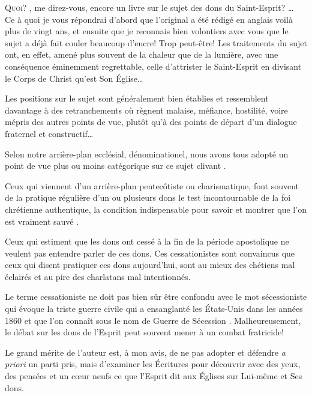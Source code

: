
\begin{preface}

\lettrine[ante=\Og]{Q}{uoi?} \Fg{}, me direz-vous, \Og encore un livre sur le sujet des dons du Saint-Esprit? \Fg{}\dots{}\\[1ex]
Ce à quoi je vous répondrai d'abord que l'original a été rédigé en anglais voilà plus de vingt ans, et ensuite que je reconnais bien volontiers avec vous que le sujet a déjà fait couler beaucoup d'encre! Trop peut-être! Les traitements du sujet ont, en effet, amené plus souvent de la \Og chaleur \Fg{} que de la lumière, avec une conséquence éminemment regrettable, celle d'attrister le Saint-Esprit en divisant le Corps de Christ qu'est Son \'Eglise\dots{}

Les positions sur le sujet sont généralement bien établies et ressemblent davantage à des retranchements où règnent malaise, méfiance, hostilité, voire mépris des autres points de vue, plutôt qu'à des points de départ d'un dialogue fraternel et constructif\dots{}

Selon notre arrière-plan ecclésial, dénominationel, nous avons tous adopté un point de vue plus ou moins catégorique sur ce sujet \Og clivant \Fg{}.

Ceux qui viennent d'un arrière-plan pentecôtiste ou charismatique, font souvent de la pratique régulière d'un ou plusieurs dons le test incontournable de la foi chrétienne authentique, la condition indispensable pour savoir et montrer que l'on est \Og vraiment sauvé \Fg{}.

Ceux qui estiment que les dons ont cessé à la fin de la période apostolique ne veulent pas entendre parler de ces dons. Ces \Og cessationistes \Fg{} sont convaincus que ceux qui disent pratiquer ces dons aujourd'hui, sont au mieux des chétiens mal éclairés et au pire des charlatans mal intentionnés.

Le terme \Og cessationiste \Fg{} ne doit pas bien sûr être confondu avec le mot \Og sécessioniste \Fg{} qui évoque la triste guerre civile qui a ensanglanté les \'Etats-Unis dans les années 1860 et que l'on connaît sous le nom de \Og Guerre de Sécession \Fg{}.
 Malheureusement, le débat sur les dons de l'Esprit peut souvent mener à un combat fratricide!

Le grand mérite de l'auteur est, à mon avis, de ne pas adopter et défendre \emph{a priori} un parti pris,
 mais \Og d'examiner les \'Ecritures \Fg{} pour découvrir avec des yeux,
 des pensées et un c\oe{}ur neufs \Og ce que l'Esprit dit aux \'Eglises \Fg{}
 sur Lui-même et Ses dons.


\end{preface}
